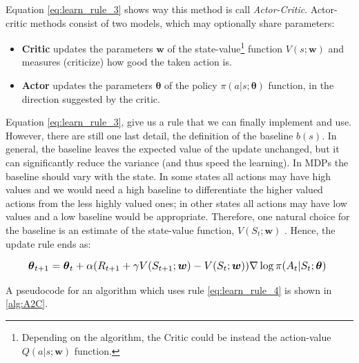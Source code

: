 \documentclass[twoside,twocolumn]{article}
\begin{document}
Equation \ref{eq:learn_rule_3} shows way this method is call \emph{Actor-Critic}. Actor-critic methods consist of two models, which may optionally share parameters:
\begin{itemize}
  \item \textbf{Critic} updates the parameters $\boldsymbol{w}$ of the state-value\footnote{Depending on the algorithm, the Critic could be instead the action-value $Q(a|s;\boldsymbol{w})$ function.} function $V(s; \boldsymbol{w})$ and measures (criticize) how good the taken action is.
  \item \textbf{Actor} updates the parameters $\boldsymbol{\theta}$ of the policy $\pi(a|s; \boldsymbol{\theta})$ function, in the direction suggested by the critic.
\end{itemize}

Equation \ref{eq:learn_rule_3}, give us a rule that we can finally implement and use. However, there are still one last detail, the definition of the baseline $b(s)$. In general, the baseline leaves the expected value of the update unchanged, but it can significantly reduce the variance (and thus speed the learning). In MDPs the baseline should vary with the state.
In some states all actions may have high values and we would need a high baseline to differentiate the higher valued actions from the less highly valued ones; in other states all actions may have low values and a low baseline would be appropriate.
Therefore, one natural choice for the baseline is an estimate of the state-value function, $V(S_{t};\boldsymbol{w})$ \cite{Sutton1998}.
Hence, the update rule ends as:

\begin{equation}
  \resizebox{.91\linewidth}{!}{%
  $
    \boldsymbol{\theta}_{t+1} = \boldsymbol{\theta}_{t} + \alpha (R_{t+1} + \gamma V(S_{t+1};\boldsymbol{w}) - V(S_{t};\boldsymbol{w})) \nabla \log{\pi (A_t|S_t; \boldsymbol{\theta})}
  $
  }
  \label{eq:learn_rule_4}
\end{equation}

A pseudocode for an algorithm which uses rule \ref{eq:learn_rule_4} is shown in \ref{alg:A2C}.
\end{document}
